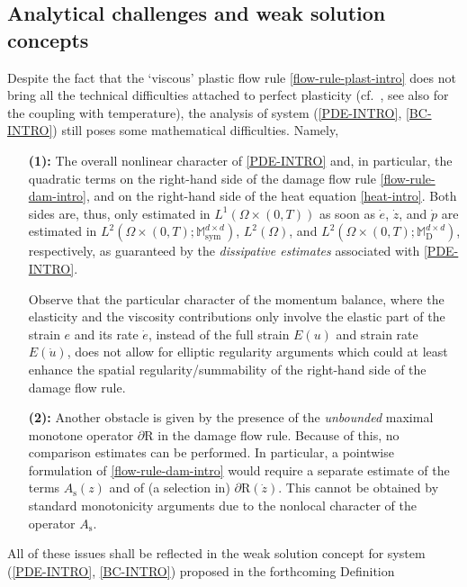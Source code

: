 \documentclass[a4paper,10pt,reqno]{amsart}
\numberwithin{equation}{section}
\newcommand{\bbM}{\mathbb{M}}
\numberwithin{equation}{section}
\newcommand{\sig}[1]{E(#1)}
\newcommand{\mt}{\bbM}
\newcommand{\sym}{\mathrm{sym}}
\newcommand{\dev}{\mathrm{D}}
\newcommand{\didname}{\mathrm{R}}
\newcommand{\As}{A_{\mathrm{s}}}
\begin{document}
\subsection{Analytical challenges and  weak solution concepts}
\label{ss:1.2}
Despite the fact that the `viscous' plastic flow rule \eqref{flow-rule-plast-intro} does not bring all the technical difficulties attached to perfect plasticity
 (cf.\ \cite{DMDSMo06QEPL}, see also \cite{Roub-PP} for the coupling with temperature), the analysis of system (\ref{PDE-INTRO}, \ref{BC-INTRO})  still poses some mathematical difficulties.
 Namely,
 \begin{itemize}
 \item[\textbf{(1):}] The overall nonlinear character of \eqref{PDE-INTRO} and, in particular, the quadratic terms on the right-hand side of the 
 damage flow rule \eqref{flow-rule-dam-intro},  and on the right-hand side of the heat equation \eqref{heat-intro}. Both sides are, thus, only estimated in $L^1(\Omega{\times}(0,T))$ as soon as $\dot{e}$, $\dot{z}$, and $\dot{p}$ are estimated in $L^2(\Omega{\times}(0,T);\mt_\sym^{d\times d})$, $L^2(\Omega)$, and $L^2(\Omega{\times}(0,T);\mt_\dev^{d\times d})$, respectively,  as guaranteed by the \emph{dissipative estimates} associated with \eqref{PDE-INTRO}.
 \par
Observe that the particular character of the momentum balance, where the elasticity and the viscosity contributions only involve the elastic part of the strain $e$ and its rate $\dot{e}$, instead of the full strain $\sig{u}$ and strain rate $\sig{\dot u}$, does not allow for elliptic regularity arguments which could at least enhance the spatial regularity/summability of the right-hand side of the damage flow rule.
 \item[\textbf{(2):}] 
 Another obstacle is given by the presence of the \emph{unbounded} maximal monotone operator $\partial\didname$ in the damage flow rule. Because of this, no comparison estimates can be performed. In particular, a pointwise formulation of \eqref{flow-rule-dam-intro} would require a separate estimate of the terms $\As(z)$ and of  (a selection in) $\partial\didname(\dot z)$. This cannot be obtained by standard monotonicity arguments due to the nonlocal character of the operator $\As$.
 \end{itemize}
 All of these  issues shall be reflected in the weak solution concept for system  (\ref{PDE-INTRO}, \ref{BC-INTRO})  proposed in the forthcoming  Definition 
\end{document}
